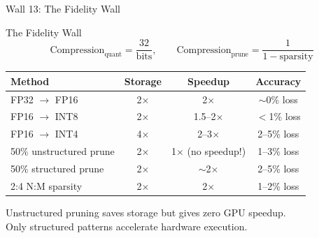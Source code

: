 \documentclass[aspectratio=169, 12pt]{beamer}
\newcommand{\wallbox}[2]{%
  \begin{block}{#1}#2\end{block}%
}
\begin{document}
\begin{frame}{Wall 13: The Fidelity Wall}

\small
\wallbox{The Fidelity Wall}{
\[
  \text{Compression}_{\text{quant}} = \frac{32}{\text{bits}},
  \qquad
  \text{Compression}_{\text{prune}} = \frac{1}{1 - \text{sparsity}}
\]
}

\vspace{0.3cm}
\begin{tabular}{lccc}
\toprule
\textbf{Method} & \textbf{Storage} & \textbf{Speedup} & \textbf{Accuracy} \\
\midrule
FP32 $\to$ FP16 & 2$\times$ & 2$\times$ & $\sim$0\% loss \\
FP16 $\to$ INT8  & 2$\times$ & 1.5--2$\times$ & $<$1\% loss \\
FP16 $\to$ INT4  & 4$\times$ & 2--3$\times$ & 2--5\% loss \\
50\% unstructured prune & 2$\times$ & \alert{1$\times$ (no speedup!)} & 1--3\% loss \\
50\% structured prune & 2$\times$ & $\sim$2$\times$ & 2--5\% loss \\
2:4 N:M sparsity & 2$\times$ & 2$\times$ & 1--2\% loss \\
\bottomrule
\end{tabular}

\vspace{0.2cm}
\alert{Unstructured pruning saves storage but gives zero GPU speedup.\\
Only structured patterns accelerate hardware execution.}
\end{frame}
\end{document}
